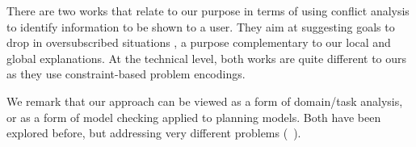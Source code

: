 There are two works that relate to our purpose in terms of using
conflict analysis to identify information to be shown to a user. They
aim at suggesting goals to drop in oversubscribed situations
\cite{yu:etal:jair-17,lauffer:topcu:xaip-19}, a purpose complementary
to our local and global explanations. At the technical level, both
works are quite different to ours as they use constraint-based problem
encodings.

We remark that our approach can be viewed as a form of domain/task
analysis, or as a form of model checking applied to planning
models. Both have been explored before, but addressing very different
problems
(\eg\ \cite{fox:long:jair-98,rintanen:aaai-00,vaquero:etal:keq-13}).
%
%



















